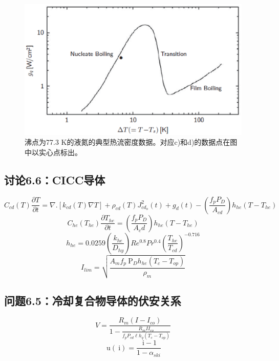 \begin{figure}[htbp]
	\centering
	\includegraphics[scale=0.6]{chpt6/figs/fig6.13.eps}
	\caption{沸点为77.3 K的液氮的典型热流密度数据。对应c)和d)的数据点在图中以实心点标出。}
\end{figure}

\subsection{讨论6.6：CICC导体}
\begin{equation}%
C_{cd}(T)\frac{\partial T}{\partial t}=\nabla.[k_{cd}(T)\nabla T]+\rho_{cd}(T)J_{cd_o}^2(t)+g_d(t)-(\frac{f_pP_D}{A_{cd}})h_{he}(T-T_{he})
\end{equation}
\begin{equation}%
C_{he}(T_{he})\frac{\partial T_{he}}{\partial t}=(\frac{f_{p}P_D}{A_cd})h_{he}(T-T_{he})
\end{equation}
\begin{equation}%
h_{he}=0.0259(\frac{k_{he}}{D_{hy}})Re^{0.8}Pr^{0.4}(\frac{T_{he}}{T_{cd}})^{-0.716}
\end{equation}
\begin{equation}%
I_{lim}=\sqrt{\frac{A_mf_p\ \mathrm{P}_Dh_{he}(T_c-T_{op})}{\rho_m}}
\end{equation}




\subsection{问题6.5：冷却复合物导体的伏安关系}


\begin{equation}%
V=\frac{R_m(I-I_{co})}{1-\frac{R_mII_{co}}{f_pP_{cd}\ell h_q(T_c-T_{op})}}
\end{equation}
\begin{equation}%
\ \mathrm{u}(\ \mathrm{i})=\frac{\ \mathrm{i}-1}{1-\alpha_{ski}}
\end{equation}


